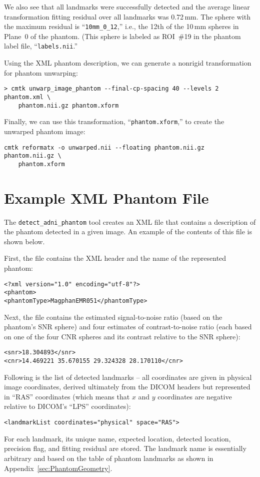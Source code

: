 \documentclass{InsightArticle}
\begin{document}
We also see that all landmarks were successfully detected and the average
linear transformation fitting residual over all landmarks was 0.72\,mm. The
sphere with the maximum residual is ``\texttt{10mm\_0\_12},'' i.e., the 12th
of the 10\,mm spheres in Plane~0 of the phantom. (This sphere is labeled as
ROI~\#19 in the phantom label file, ``\texttt{labels.nii}.''

Using the XML phantom description, we can generate a nonrigid transformation
for phantom unwarping:
\begin{verbatim}
> cmtk unwarp_image_phantom --final-cp-spacing 40 --levels 2 phantom.xml \
    phantom.nii.gz phantom.xform
\end{verbatim}
Finally, we can use this transformation, ``\texttt{phantom.xform},'' to create
the unwarped phantom image:
\begin{verbatim}
cmtk reformatx -o unwarped.nii --floating phantom.nii.gz phantom.nii.gz \
    phantom.xform
\end{verbatim}

\section{Example XML Phantom File}
\label{sec:ExampleXML}

The \texttt{detect\_adni\_phantom} tool creates an XML file that contains a
description of the phantom detected in a given image. An example of the
contents of this file is shown below.

First, the file contains the XML header and the name of the represented
phantom:
\begin{verbatim}
<?xml version="1.0" encoding="utf-8"?>
<phantom>
<phantomType>MagphanEMR051</phantomType>
\end{verbatim}
Next, the file contains the estimated signal-to-noise ratio (based on the
phantom's SNR sphere) and four estimates of contrast-to-noise ratio (each
based on one of the four CNR spheres and its contrast relative to the SNR
sphere):
\begin{verbatim}
<snr>18.304893</snr>
<cnr>14.469221 35.670155 29.324328 28.170110</cnr>
\end{verbatim}
Following is the list of detected landmarks -- all coordinates are given in
physical image coordinates, derived ultimately from the DICOM headers but
represented in ``RAS'' coordinates (which means that $x$ and $y$ coordinates
are negative relative to DICOM's ``LPS'' coordinates):
\begin{verbatim}
<landmarkList coordinates="physical" space="RAS">
\end{verbatim} 
For each landmark, its unique name, expected location, detected
location, precision flag, and fitting residual are stored. The landmark name
is essentially arbitrary and based on the table of phantom landmarks as shown
in Appendix~\ref{sec:PhantomGeometry}.
\end{document}
